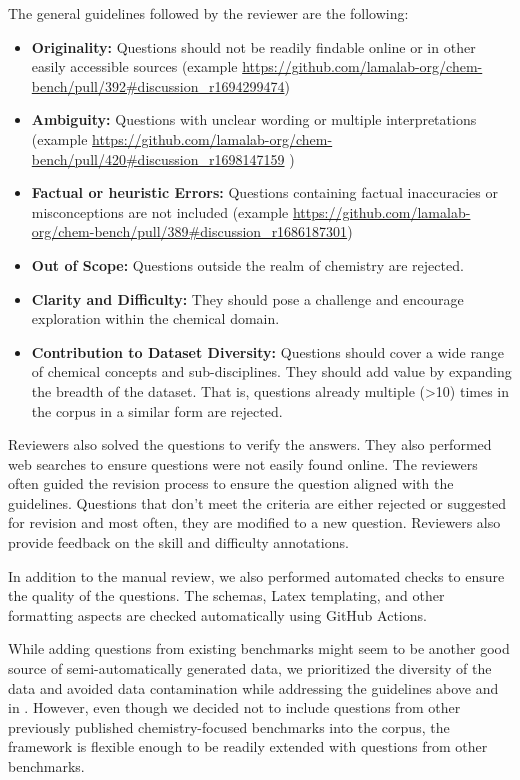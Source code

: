The general guidelines followed by the reviewer are the following:

\begin{itemize}
    \item \textbf{Originality:} Questions should not be readily findable online or in other easily accessible sources (example \url{https://github.com/lamalab-org/chem-bench/pull/392#discussion_r1694299474})
    \item \textbf{Ambiguity:} Questions with unclear wording or multiple interpretations (example \url{https://github.com/lamalab-org/chem-bench/pull/420#discussion_r1698147159} )
    \item \textbf{Factual or heuristic Errors: }Questions containing factual inaccuracies or misconceptions are not included (example \url{https://github.com/lamalab-org/chem-bench/pull/389#discussion_r1686187301})
    \item \textbf{Out of Scope:} Questions outside the realm of chemistry are rejected.
    \item \textbf{Clarity and Difficulty: } They should pose a challenge and encourage exploration within the chemical domain.
    \item \textbf{Contribution to Dataset Diversity: }Questions should cover a wide range of chemical concepts and sub-disciplines. They should add value by expanding the breadth of the dataset. That is, questions already multiple (>10) times in the corpus in a similar form are rejected.
\end{itemize}

Reviewers also solved the questions to verify the answers. They also performed web searches to ensure questions were not easily found online. The reviewers often guided the revision process to ensure the question aligned with the guidelines. Questions that don't meet the criteria are either rejected or suggested for revision and most often, they are modified to a new question. Reviewers also provide feedback on the skill and difficulty annotations.

In addition to the manual review, we also performed automated checks to ensure the quality of the questions. The schemas, Latex templating, and other formatting aspects are checked automatically using GitHub Actions.

While adding questions from existing benchmarks might seem to be another good source of semi-automatically generated data, we prioritized the diversity of the data and avoided data contamination while addressing the guidelines above and in .
However, even though we decided not to include questions from other previously published chemistry-focused benchmarks into the \chembench corpus, the framework is flexible enough to be readily extended with questions from other benchmarks.

